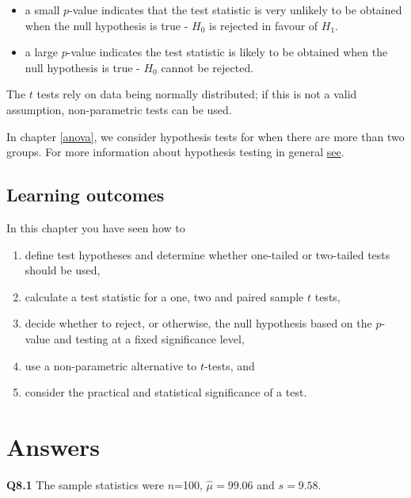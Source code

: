 \documentclass[
  oneside]{krantz}
\begin{document}
\begin{itemize}
\item
  a small \(p\)-value indicates that the test statistic is very unlikely to be obtained when the null hypothesis is true - \(H_0\) is rejected in favour of \(H_1\).
\item
  a large \(p\)-value indicates the test statistic is likely to be obtained when the null hypothesis is true - \(H_0\) cannot be rejected.
\end{itemize}

The \(t\) tests rely on data being normally distributed; if this is not a valid assumption, non-parametric tests can be used.

In chapter \ref{anova}, we consider hypothesis tests for when there are more than two groups. For more information about hypothesis testing in general \href{https://www.khanacademy.org/math/probability/statistics-inferential/hypothesis-testing/v/hypothesis-testing-and-p-values}{see}.

\hypertarget{learning-outcomes-5}{%
\subsection{Learning outcomes}\label{learning-outcomes-5}}

In this chapter you have seen how to

\begin{enumerate}
\def\labelenumi{\arabic{enumi}.}
\item
  define test hypotheses and determine whether one-tailed or two-tailed tests should be used,
\item
  calculate a test statistic for a one, two and paired sample \(t\) tests,
\item
  decide whether to reject, or otherwise, the null hypothesis based on the \(p\)-value and testing at a fixed significance level,
\item
  use a non-parametric alternative to \(t\)-tests, and
\item
  consider the practical and statistical significance of a test.
\end{enumerate}

\hypertarget{ANShyp}{%
\section{Answers}\label{ANShyp}}

\textbf{Q8.1} The sample statistics were \(n\)=100, \(\hat \mu = 99.06\) and \(s=9.58\).
\end{document}
